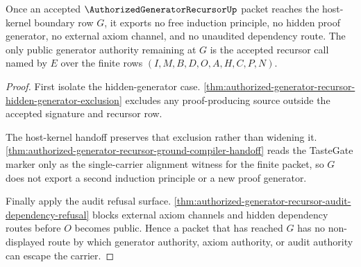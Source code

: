 \begin{theorem}
\label{thm:authorized-generator-recursor-root-boundary-nonescape}
Once an accepted $\AuthorizedGeneratorRecursorUp$ packet reaches the
host-kernel boundary row $G$, it exports no free induction principle, no
hidden proof generator, no external axiom channel, and no unaudited dependency
route. The only public generator authority remaining at $G$ is the accepted
recursor call named by $E$ over the finite rows
$(I,M,B,D,O,A,H,C,P,N)$.
\end{theorem}
\begin{proof}
First isolate the hidden-generator case.
\autoref{thm:authorized-generator-recursor-hidden-generator-exclusion}
excludes any proof-producing source outside the accepted signature and
recursor row.

The host-kernel handoff preserves that exclusion rather than widening it.
\autoref{thm:authorized-generator-recursor-ground-compiler-handoff} reads the
TasteGate marker only as the single-carrier alignment witness for the finite
packet, so $G$ does not export a second induction principle or a new proof
generator.

Finally apply the audit refusal surface.
\autoref{thm:authorized-generator-recursor-audit-dependency-refusal} blocks
external axiom channels and hidden dependency routes before $O$ becomes
public. Hence a packet that has reached $G$ has no non-displayed route by
which generator authority, axiom authority, or audit authority can escape the
carrier.
\end{proof}

